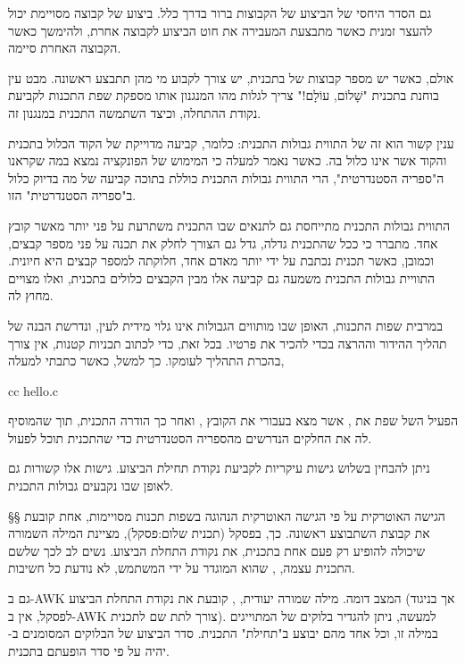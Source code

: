 גם הסדר היחסי של הביצוע של הקבוצות ברור בדרך כלל. ביצוע של קבוצה מסויימת יכול
להעצר זמנית כאשר מתבצעת  המעבירה את חוט הביצוע לקבוצה אחרת, ולהימשך כאשר
הקבוצה האחרת סיימה.

אולם, כאשר יש מספר קבוצות של  בתכנית, יש צורך לקבוע מי מהן תתבצע
ראשונה. מבט עין בוחנת בתכנית "שָׁלוֹם, עוֹלָם!" צריך לגלות מהו המנגנון אותו מספקת
שפת התכנות לקביעת נקודת ההתחלה, וכיצד השתמשה התכנית במנגנון זה.

ענין קשור הוא זה של התווית גבולות התכנית: כלומר, קביעה מדוייקת
של הקוד הכלול בתכנית והקוד אשר אינו כלול בה. כאשר נאמר למעלה כי המימוש של
הפונקציה  נמצא במה שקראנו ה"ספריה הסטנדרטית", הרי התווית גבולות
התכנית כוללת בתוכה קביעה של מה בדיוק כלול ב"ספריה הסטנדרטית" הזו.

התווית גבולות התכנית מתייחסת גם לתנאים שבו התכנית משתרעת על פני יותר מאשר
קובץ אחד. מתברר כי ככל שהתכנית גדלה, גדל גם הצורך לחלק את תכנה על פני מספר
קבצים, וכמובן, כאשר תכנית נכתבת על ידי יותר מאדם אחד, חלוקתה למספר קבצים היא
חיונית. התוויית גבולות התכנית משמעה גם קביעה אלו מבין הקבצים כלולים בתכנית,
ואלו מצויים מחוץ לה.

במרבית שפות התכנות, האופן שבו מותווים הגבולות אינו גלוי מידית לעין, ונדרשת
הבנה של תהליך ההידור וההרצה בכדי להכיר את פרטיו. בכל זאת, כדי לכתוב תכניות
קטנות, אין צורך בהכרת התהליך לעומקו. כך למשל, כאשר כתבתי למעלה,
\begin{קוד}
cc hello.c
\END
\end{קוד}
הפעיל ה של שפת  את , אשר מצא בעבורי את הקובץ
, ואחר כך הודרה התכנית, תוך שה מוסיף לה את החלקים הנדרשים
מהספריה הסטנדרטית כדי שהתכנית תוכל לפעול.

ניתן להבחין בשלוש גישות עיקריות לקביעת נקודת תחילת הביצוע. גישות אלו קשורות
גם לאופן שבו נקבעים גבולות התכנית.

§§ הגישה האוטרקית
על פי הגישה האוטרקית הנהוגה בשפות תכנות מסויימות, אחת  קובעת את קבוצת ה שתבוצע ראשונה. כך, בפסקל ( תכנית
שלום:פסקל), מציינת המילה השמורה  שיכולה להופיע רק פעם אחת בתכנית,
את נקודת התחלת הביצוע. נשים לב לכך שלשם התכנית עצמה, , שהוא
 המוגדר על ידי המשתמש, לא נודעת כל חשיבות.

גם ב-AWK המצב דומה. מילה שמורה יעודית, , קובעת את נקודת התחלת
הביצוע (אך בניגוד לפסקל, אין ב-AWK צורך לתת שם לתכנית).
למעשה, ניתן להגדיר בלוקים של  המתוייגים במילה זו, וכל אחד מהם
יבוצע ב"תחילת" התכנית. סדר הביצוע של הבלוקים המסומנים ב-
יהיה על פי סדר הופעתם בתכנית.

